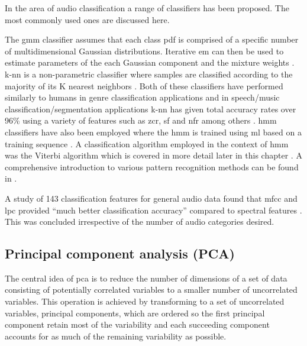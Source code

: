 

In the area of audio classification a range of classifiers has been proposed. The most commonly used ones are discussed here.

The \gls{gmm} classifier assumes that each class pdf is comprised of a specific number of multidimensional Gaussian distributions. Iterative \gls{em} can then be used to estimate parameters of the each Gaussian component and the mixture weights \cite{Tzanetakis2002}. \gls{k-nn} is a non-parametric classifier where samples are classified according to the majority of its K nearest neighbors \cite{Lu2001}. Both of these classifiers have performed similarly to humans in genre classification applications \cite{Tzanetakis2002} and in speech/music classification/segmentation applications \gls{k-nn} has given total accuracy rates over 96\% using a variety of features such as \gls{zcr}, \gls{sf} and \gls{nfr} among others \cite{Lu2002}. \gls{hmm} classifiers have also been employed where the \gls{hmm} is trained using \gls{ml} based on a training sequence \cite{Kimber1997}\cite{Xiong2003}\cite{Burke2013}. A classification algorithm employed in the context of \gls{hmm} was the Viterbi algorithm which is covered in more detail later in this chapter \cite{Kimber1997}\cite{Burke2013}.
A comprehensive introduction to various pattern recognition methods can be found in \cite{Duda2001}.

A study of 143 classification features for general audio data found that \gls{mfcc} and \gls{lpc} provided ``much better classification accuracy'' compared to spectral features \cite{Li2001}. This was concluded irrespective of the number of audio categories desired.

\subsection{Principal component analysis (PCA)}
The central idea of \gls{pca} is to reduce the number of dimensions of a set of data consisting of potentially correlated variables to a smaller number of uncorrelated variables. This operation is achieved by transforming to a set of uncorrelated variables, principal components, which are ordered so the first principal component retain most of the variability and each succeeding component accounts for as much of the remaining variability as possible.

